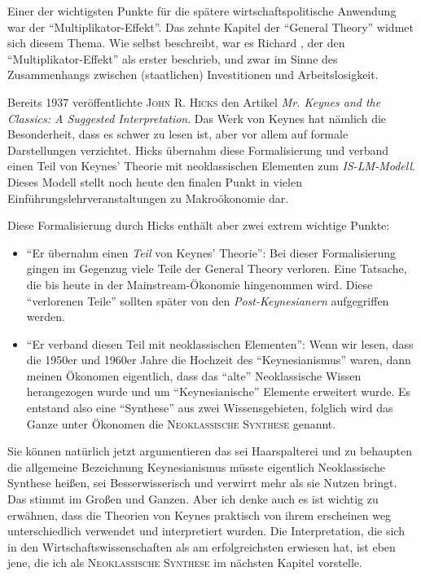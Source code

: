 Einer der wichtigsten Punkte für die spätere wirtschaftspolitische Anwendung war der "`Multiplikator-Effekt"'. Das zehnte Kapitel der "`General Theory"' widmet sich diesem Thema. Wie \textcite[S. 114]{Keynes1936} selbst beschreibt, war es Richard \textcite{Kahn1931}, der den "`Multiplikator-Effekt"' als erster beschrieb, und zwar im Sinne des Zusammenhangs zwischen (staatlichen) Investitionen und Arbeitslosigkeit.






Bereits 1937 veröffentlichte \textsc{John R. Hicks} den Artikel \textit{Mr. Keynes and the Classics: A Suggested Interpretation}. Das Werk von Keynes hat nämlich die Besonderheit, dass es schwer zu lesen ist, aber vor allem auf formale Darstellungen verzichtet. Hicks übernahm diese Formalisierung und verband einen Teil von Keynes' Theorie mit neoklassischen Elementen zum \textit{IS-LM-Modell}. Dieses Modell stellt noch heute den finalen Punkt in vielen Einführungslehrveranstaltungen zu Makroökonomie dar.

Diese Formalisierung durch Hicks enthält aber zwei extrem wichtige Punkte:
\begin{itemize}
	\item "`Er übernahm einen \textit{Teil} von Keynes' Theorie"': Bei dieser Formalisierung gingen im Gegenzug viele Teile der General Theory verloren. Eine Tatsache, die bis heute in der Mainstream-Ökonomie hingenommen wird. Diese "`verlorenen Teile"' sollten später von den \textit{Post-Keynesianern} aufgegriffen werden.
	\item "`Er verband diesen Teil mit neoklassischen Elementen"': Wenn wir lesen, dass die 1950er und 1960er Jahre die Hochzeit des "`Keynesianismus"' waren, dann meinen Ökonomen eigentlich, dass das "`alte"' Neoklassische Wissen herangezogen wurde und um "`Keynesianische"' Elemente erweitert wurde. Es entstand also eine "`Synthese"' aus zwei Wissensgebieten, folglich wird das Ganze unter Ökonomen die \textsc{Neoklassische Synthese} genannt.
\end{itemize}

Sie können natürlich jetzt argumentieren das sei Haarspalterei und zu behaupten die allgemeine Bezeichnung Keynesianismus müsste eigentlich Neoklassische Synthese heißen, sei Besserwisserisch und verwirrt mehr als sie Nutzen bringt. Das stimmt im Großen und Ganzen. Aber ich denke auch es ist wichtig zu erwähnen, dass die Theorien von Keynes praktisch von ihrem erscheinen weg unterschiedlich verwendet und interpretiert wurden. Die Interpretation, die sich in den Wirtschaftswissenschaften als am erfolgreichsten erwiesen hat, ist eben jene, die ich als \textsc{Neoklassische Synthese} im nächsten Kapitel vorstelle. 



